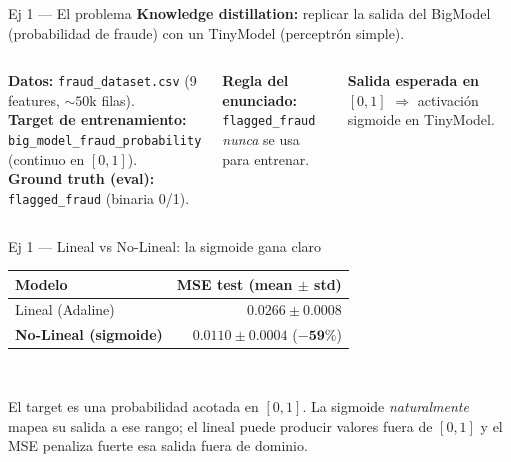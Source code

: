 \documentclass[11pt,aspectratio=169]{beamer}
\newcommand{\code}[1]{\texttt{\textcolor{accent}{#1}}}
\newcommand{\file}[1]{\texttt{\small #1}}
\begin{document}
\begin{frame}{Ej 1 — El problema}
\textbf{Knowledge distillation:} replicar la salida del BigModel (probabilidad de fraude) con un TinyModel (perceptrón simple).\\[0.6em]

\begin{columns}[T]
\textbf{Datos:} \file{fraud\_dataset.csv} (9 features, $\sim 50$k filas).\\[0.4em]

\textbf{Target de entrenamiento:}\\
\code{big\_model\_fraud\_probability} (continuo en $[0,1]$).\\[0.4em]

\textbf{Ground truth (eval):}\\
\code{flagged\_fraud} (binaria 0/1).

\begin{warning}
\textbf{Regla del enunciado:}\\ \code{flagged\_fraud} \emph{nunca} se usa para entrenar.
\end{warning}
\vspace{0.6em}

\textbf{Salida esperada en $[0,1]$} $\Rightarrow$ activación sigmoide en TinyModel.
\end{columns}
\end{frame}

\begin{frame}{Ej 1 — Lineal vs No-Lineal: la sigmoide gana claro}
\centering
\begin{tabular}{@{}lr@{}}
\toprule
\textbf{Modelo} & \textbf{MSE test (mean $\pm$ std)} \\
\midrule
Lineal (Adaline)        & $0.0266 \pm 0.0008$ \\
\rowcolor{accent2!15}
\textbf{No-Lineal (sigmoide)} & $\boldsymbol{0.0110 \pm 0.0004}$ \quad ($\boldsymbol{-59\%}$) \\
\bottomrule
\end{tabular}\\[1em]

\begin{insight}
El target es una probabilidad acotada en $[0,1]$. La sigmoide \emph{naturalmente} mapea su salida a ese rango; el lineal puede producir valores fuera de $[0,1]$ y el MSE penaliza fuerte esa salida fuera de dominio.
\end{insight}
\end{frame}
\end{document}
